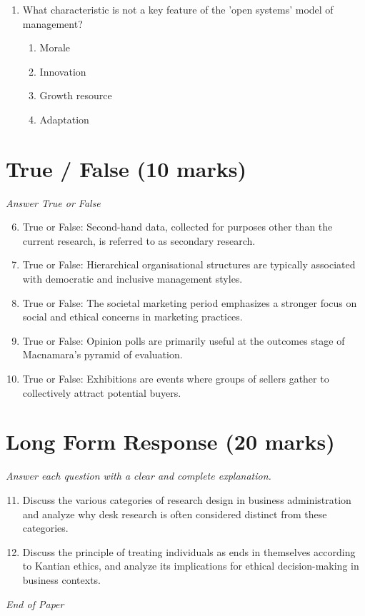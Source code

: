 \documentclass[12pt]{article}
\begin{document}
\begin{enumerate}[label=\arabic*.]
\begin{enumerate}[label=(\alph*)]
    \item Group culture
    \item Collective culture
\end{enumerate}
\item What characteristic is not a key feature of the 'open systems' model of management?
\begin{enumerate}[label=(\alph*)]
    \item Morale
    \item Innovation
    \item Growth resource
    \item Adaptation
\end{enumerate}
\end{enumerate}

\section*{True / False (10 marks)}
\textit{Answer True or False}
\begin{enumerate}[label=\arabic*.]
\setcounter{enumi}{5}
\item True or False: Second-hand data, collected for purposes other than the current research, is referred to as secondary research.
\item True or False: Hierarchical organisational structures are typically associated with democratic and inclusive management styles.
\item True or False: The societal marketing period emphasizes a stronger focus on social and ethical concerns in marketing practices.
\item True or False: Opinion polls are primarily useful at the outcomes stage of Macnamara's pyramid of evaluation.
\item True or False: Exhibitions are events where groups of sellers gather to collectively attract potential buyers.
\end{enumerate}

\section*{Long Form Response (20 marks)}
\textit{Answer each question with a clear and complete explanation.}
\begin{enumerate}[label=\arabic*.]
\setcounter{enumi}{10}
\item Discuss the various categories of research design in business administration and analyze why desk research is often considered distinct from these categories.
\item Discuss the principle of treating individuals as ends in themselves according to Kantian ethics, and analyze its implications for ethical decision-making in business contexts.
\end{enumerate}

\vfill
\noindent\textit{End of Paper}
\end{document}
